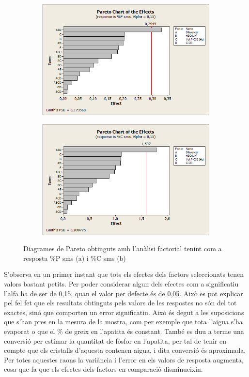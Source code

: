 \documentclass[a4paper]{article}
\begin{document}
\begin{figure}[H]
	\begin{subfigure}{.5\textwidth}
		\centering
		\includegraphics[width=.9\linewidth]{images/Pareto15P}
		\caption{}
		\label{fig:Pareto15P}
	\end{subfigure}%
	\begin{subfigure}{.5\textwidth}
		\centering
		\includegraphics[width=.9\linewidth]{images/Pareto15C}
		\caption{}
		\label{fig:Pareto15C}
	\end{subfigure}
	\caption{Diagrames de Pareto obtinguts amb l’anàlisi factorial tenint com a resposta \%P sms (a) i \%C sms (b)}
	\label{fig:Pareto15}
\end{figure}

S’observa en un primer instant que tots els efectes dels factors seleccionats tenen valors bastant petits. Per poder considerar algun dels efectes com a significatiu l’alfa ha de ser de 0,15, quan el valor per defecte és de 0,05. Això es pot explicar pel fel fet que els resultats obtinguts pels valors de les respostes no són del tot exactes, sinó que comporten un error significatiu. Això és degut a les suposicions que s’han pres en la mesura de la mostra, com per exemple que tota l’aigua s’ha evaporat o que el \% de greix en l’apatita és constant. També es duu a terme una conversió per estimar la quantitat de fòsfor en l’apatita, per tal de tenir en compte que els cristalls d’aquesta contenen aigua, i dita conversió és aproximada. Per totes aquestes raons la variància i l’error en els valors de resposta augmenta, cosa que fa que els efectes dels factors en comparació disminueixin.
\end{document}
